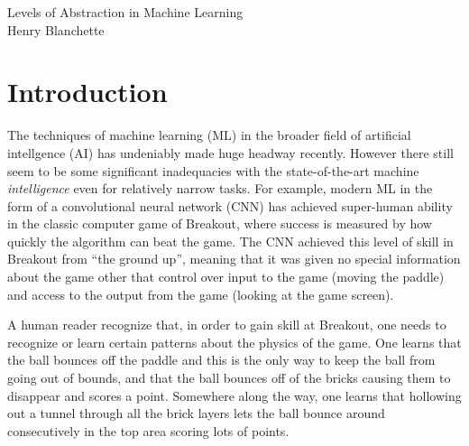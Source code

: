 \documentclass{article}
\renewcommand{\it}{\textit}
\begin{document}
\begin{center}
{\Large \sc Levels of Abstraction in Machine Learning}
\\[2em]
{\large Henry Blanchette}
\end{center}


\vspace{2em}

\section{Introduction}

The techniques of machine learning (ML) in the broader field of artificial intellgence (AI) has undeniably made huge headway recently.
However there still seem to be some significant inadequacies with the state-of-the-art machine \it{intelligence} even for relatively narrow tasks.
For example, modern ML in the form of a convolutional neural network (CNN) has achieved super-human ability in the classic computer game of Breakout, where success is measured by how quickly the algorithm can beat the game.
The CNN achieved this level of skill in Breakout from ``the ground up'', meaning that it was given no special information about the game other that control over input to the game (moving the paddle) and access to the output from the game (looking at the game screen).

A human reader recognize that, in order to gain skill at Breakout, one needs to recognize or learn certain patterns about the physics of the game.
One learns that the ball bounces off the paddle and this is the only way to keep the ball from going out of bounds, and that the ball bounces off of the bricks causing them to disappear and scores a point.
Somewhere along the way, one learns that hollowing out a tunnel through all the brick layers lets the ball bounce around consecutively in the top area scoring lots of points.
\end{document}
